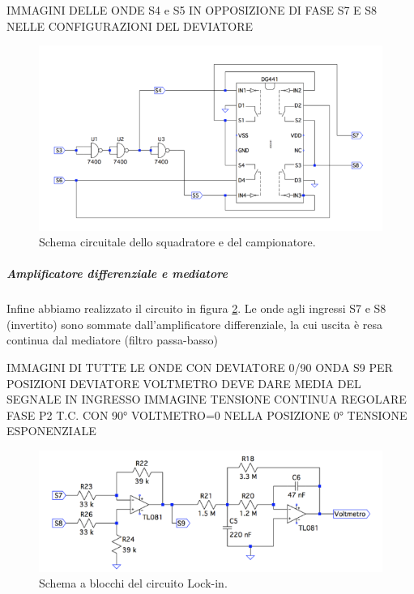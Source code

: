 \documentclass[10pt,a4paper]{article}
\begin{document}
IMMAGINI DELLE ONDE
S4 e S5 IN OPPOSIZIONE DI FASE
S7 E S8 NELLE CONFIGURAZIONI DEL DEVIATORE

\begin{figure}[!htb]
  \centering
  \includegraphics[scale=0.75]{sqadratore-campionatore.png}
\caption{Schema circuitale dello squadratore e del campionatore.\label{fig:sqadratore-campionatore}}
\end{figure}


\subparagraph{Amplificatore differenziale e mediatore}
Infine abbiamo realizzato il circuito in figura \ref{fig:amplificatorediff-mediatore}. Le onde agli ingressi S7 e S8 (invertito) sono sommate dall'amplificatore differenziale, la cui uscita è resa continua dal mediatore (filtro passa-basso)

IMMAGINI DI TUTTE LE ONDE CON DEVIATORE 0/90
ONDA S9 PER POSIZIONI DEVIATORE%
VOLTMETRO DEVE DARE MEDIA DEL SEGNALE IN INGRESSO
IMMAGINE TENSIONE CONTINUA
REGOLARE FASE P2 T.C. CON 90° VOLTMETRO=0 %
NELLA POSIZIONE 0° TENSIONE ESPONENZIALE

\begin{figure}[!htb]
  \centering
  \includegraphics[scale=0.75]{amplificatorediff-mediatore.png}
\caption{Schema a blocchi del circuito Lock-in.\label{fig:amplificatorediff-mediatore}}
\end{figure}
\end{document}
